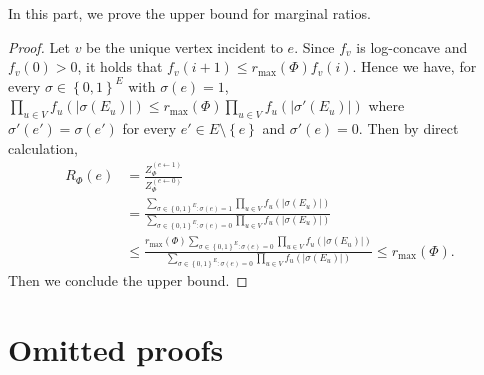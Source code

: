\documentclass[11pt]{article}
\newcommand{\abs}[1]{\left\vert#1\right\vert}
\newcommand{\set}[1]{\left\{#1\right\}}
\def\!#1{\mathtt{#1}}
\begin{document}
In this part, we prove the upper bound for marginal ratios.

\MarginalRatioBound*
\begin{proof}
    Let $v$ be the unique vertex incident to $e$. Since $f_v$ is log-concave and $f_v(0) > 0$, it holds that $f_v(i + 1) \le r_{\max}(\Phi) f_v(i)$. Hence we have, for every $\sigma \in \set{0, 1}^E$ with $\sigma(e) = 1$, $\prod_{u \in V} f_u\left(\abs{\sigma(E_u)}\right) \le r_{\max}(\Phi) \prod_{u \in V} f_u\left(\abs{\sigma'(E_u)}\right)$ where $\sigma'(e') = \sigma(e')$ for every $e' \in E \setminus \set{e}$ and $\sigma'(e) = 0$. Then by direct calculation,
    \begin{align*}
        R_{\Phi}(e) &= \frac{Z_{\Phi}^{(e \gets 1)}}{Z_{\Phi}^{(e \gets 0)}} \\
        &= \frac{\sum_{\sigma \in \set{0, 1}^E : \sigma(e) = 1} \prod_{u \in V} f_u\left(\abs{\sigma(E_u)}\right)}{\sum_{\sigma \in \set{0, 1}^E : \sigma(e) = 0} \prod_{u \in V} f_u\left(\abs{\sigma(E_u)}\right)} \\
        &\le \frac{r_{\max}(\Phi) \sum_{\sigma \in \set{0, 1}^E : \sigma(e) = 0} \prod_{u \in V} f_u\left(\abs{\sigma(E_u)}\right)}{\sum_{\sigma \in \set{0, 1}^E : \sigma(e) = 0} \prod_{u \in V} f_u\left(\abs{\sigma(E_u)}\right)} \le r_{\max}(\Phi).
    \end{align*}
    Then we conclude the upper bound.
\end{proof}

\section{Omitted proofs}\label{sec:omitted Proofs}

\end{document}
